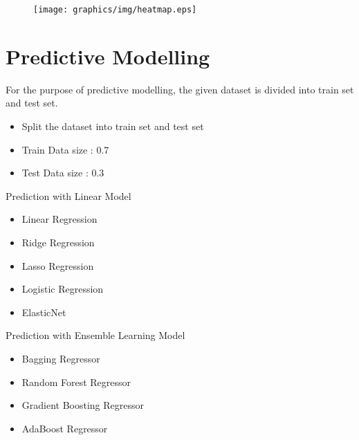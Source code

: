 \begin{figure}
  \centerline{\texttt{[image: graphics/img/heatmap.eps]}}
\end{figure}





\section{Predictive Modelling} \label{sec-model}
For the purpose of predictive modelling, the given dataset is divided into train set and test set.
\begin{itemize}
  \item Split the dataset into train set and test set
  \item Train Data size : 0.7
  \item Test Data size : 0.3
  \end{itemize}
Prediction with Linear Model
\begin{itemize}
  \item Linear Regression
  \item Ridge Regression
  \item Lasso Regression
  \item Logistic Regression
  \item ElasticNet
  \end{itemize}

  Prediction with Ensemble Learning Model
  \begin{itemize}
    \item Bagging Regressor
    \item Random Forest Regressor
    \item Gradient Boosting Regressor
    \item AdaBoost Regressor
    
    \end{itemize}

